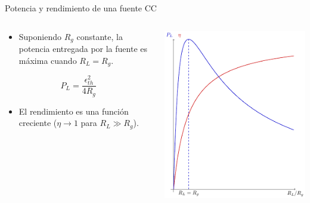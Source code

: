 \documentclass[aspectratio=169, usenames,svgnames,dvipsnames]{beamer}
\begin{document}
\begin{frame}[label={sec:orgaa2c24a}]{Potencia y rendimiento de una fuente CC}
\begin{columns}
\begin{column}{0.5\columnwidth}
\begin{itemize}
\item Suponiendo \(R_g\) constante, la potencia entregada por la fuente es máxima cuando \(R_L = R_g\).
\end{itemize}

\begin{equation*}
  P_L = \frac{\epsilon^2_{th}}{4 R_g}
\end{equation*}

\begin{itemize}
\item El rendimiento es una función creciente (\(\eta \to 1\) para \(R_L \gg R_g\)).
\end{itemize}
\end{column}

\begin{column}{0.5\columnwidth}
\begin{center}
\includegraphics[height=0.85\textheight]{../figs/FuenteReal_PotenciaRendimiento.pdf}
\end{center}
\end{column}
\end{columns}
\end{frame}
\end{document}
